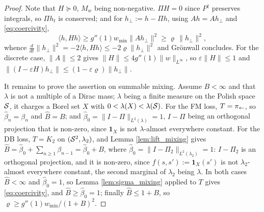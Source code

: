\begin{theorem}
\end{theorem}

\begin{proof}
Note that $H\succeq 0$, $M_w$ being non-negative. $\Pi H = 0$ since $P^\dagger$ preserves integrals, so $\Pi h_t$ is conserved; and for $h_\perp := h - \Pi h$, using $Ah = Ah_\perp$ and \eqref{eq:coercivity},
\begin{equation}
    \langle h, Hh\rangle \geq g''(1) w_{\min}\|Ah_\perp\|^2 \geq \varrho\, \|h_\perp\|^2,
\end{equation}
whence $\frac{d}{dt}\|h_\perp\|^2 = -2\langle h,Hh\rangle \leq -2\varrho\|h_\perp\|^2$ and Gr\"onwall concludes. For the discrete case, $\|A\|\leq 2$ gives $\|H\| \leq 4g''(1)\|w\|_{L^\infty}$, so $\varepsilon\|H\|\leq1$ and $\|(I-\varepsilon H)h_\perp\| \leq (1-\varepsilon\varrho)\|h_\perp\|$.

It remains to prove the assertion on summable mixing. Assume $B<\infty$ and that $\lambda$ is not a multiple of a Dirac mass; $\lambda$ being a finite measure on the Polish space $\mathcal S$, it charges a Borel set $X$ with $0<\lambda(X)<\lambda(\mathcal S)$. For the FM loss, $T=\pi_{\leftarrow}$, so $\widehat\beta_n=\beta_n$ and $\widehat B=B$; and $\widehat\beta_0=\|I-\Pi\|_{L^2(\lambda)}=1$, $I-\Pi$ being an orthogonal projection that is non-zero, since $\mathbf 1_X$ is not $\lambda$-almost everywhere constant. For the DB loss, $T=K_2$ on $(\mathcal S^2,\lambda_2)$, and Lemma \ref{lem:lift_mixing} gives $\widehat B=\widehat\beta_0+\sum_{n\geq1}\beta_{n-1}=\widehat\beta_0+B$, where $\widehat\beta_0=\|I-\Pi_2\|_{L^2(\lambda_2)}=1$: $I-\Pi_2$ is an orthogonal projection, and it is non-zero, since $f(s,s'):=\mathbf 1_X(s')$ is not $\lambda_2$-almost everywhere constant, the second marginal of $\lambda_2$ being $\lambda$. In both cases $\widehat B<\infty$ and $\widehat\beta_0=1$, so Lemma \ref{lem:sigma_mixing} applied to $T$ gives \eqref{eq:coercivity}, and $\widehat B\geq\widehat\beta_0=1$; finally $\widehat B\leq1+B$, so $\varrho\geq g''(1)w_{\min}/(1+B)^2$.
\end{proof}

